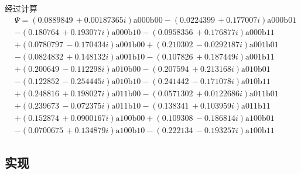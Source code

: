 经过计算
\begin{equation}
\begin{split}
&\Psi = (0.0889849\, +0.00187365 i) \text{a000} \text{b00}-(0.0224399\, +0.177007 i) \text{a000} \text{b01}\\
&-(0.180764\, +0.193077 i) \text{a000} \text{b10}-(0.0958356\, +0.176877 i) \text{a000} \text{b11}\\
&+(0.0780797\, -0.170434 i) \text{a001} \text{b00}+(0.210302\, -0.0292187 i) \text{a001} \text{b01}\\
&-(0.0824832\, +0.148132 i) \text{a001} \text{b10}-(0.107826\, +0.187449 i) \text{a001} \text{b11}\\
&+(0.200649\, -0.112298 i) \text{a010} \text{b00}-(0.207594\, +0.213168 i) \text{a010} \text{b01}\\
&-(0.122852\, -0.254445 i) \text{a010} \text{b10}-(0.241442\, -0.171078 i) \text{a010} \text{b11}\\
&+(0.248816\, +0.198027 i) \text{a011} \text{b00}-(0.0571302\, +0.0122686 i) \text{a011} \text{b01}\\
&+(0.239673\, -0.072375 i) \text{a011} \text{b10}-(0.138341\, +0.103959 i) \text{a011} \text{b11}\\
&+(0.152874\, +0.0900167 i) \text{a100} \text{b00}+(0.109308\, -0.186814 i) \text{a100} \text{b01}\\
&-(0.0700675\, +0.134879 i) \text{a100} \text{b10}-(0.222134\, -0.193257 i) \text{a100} \text{b11}
\end{split}
\end{equation}

\subsection{\label{sec:AEImplement}实现}

